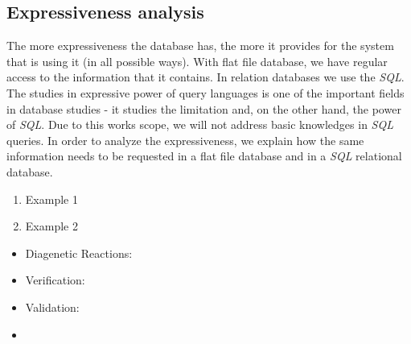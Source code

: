 \subsection{Expressiveness analysis}
The more expressiveness the database has, the more it provides for the system that is using it (in all possible ways). With flat file database, we have regular access to the information that it contains. In relation databases we use the \emph{SQL}. The studies in expressive power of query languages is one of the important fields in database studies - it studies the limitation and, on the other hand, the power of \emph{SQL}. Due to this works scope, we will not address basic knowledges in \emph{SQL} queries. 
In order to analyze the expressiveness, we explain how the same information needs to be requested in a flat file database and in a \emph{SQL} relational database. 

\begin{enumerate}
\item Example 1
\item Example 2
\end{enumerate}


\begin{itemize}
\item Diagenetic Reactions:
\item Verification: 
\item Validation: 
\item 
\end{itemize}